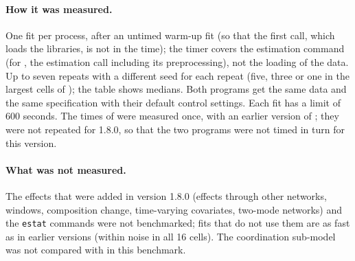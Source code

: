 \paragraph{How it was measured.} One fit per process, after an untimed warm-up fit (so that the first call, which loads the libraries, is not in the time); the timer covers the estimation command (for \goldfish{}, the estimation call including its preprocessing), not the loading of the data. Up to seven repeats with a different seed for each repeat (five, three or one in the largest cells of \goldfish{}); the table shows medians. Both programs get the same data and the same specification with their default control settings. Each fit has a limit of 600 seconds. The times of \goldfish{} were measured once, with an earlier version of \nwdynam{}; they were not repeated for 1.8.0, so that the two programs were not timed in turn for this version.

\paragraph{What was not measured.} The effects that were added in version 1.8.0 (effects through other networks, windows, composition change, time-varying covariates, two-mode networks) and the \texttt{estat} commands were not benchmarked; fits that do not use them are as fast as in earlier versions (within noise in all 16 cells). The coordination sub-model was not compared with \goldfish{} in this benchmark.
